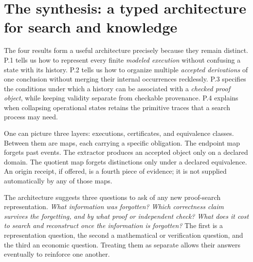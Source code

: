 \documentclass[11pt,letterpaper]{article}
\theoremstyle{plaincompact}
\begin{document}
\section{The synthesis: a typed architecture for search and knowledge}
The four results form a useful architecture precisely because they remain distinct. P.1 tells us how to represent every finite \emph{modeled execution} without confusing a state with its history. P.2 tells us how to organize multiple \emph{accepted derivations} of one conclusion without merging their internal occurrences recklessly. P.3 specifies the conditions under which a history can be associated with a \emph{checked proof object}, while keeping validity separate from checkable provenance. P.4 explains when collapsing operational states retains the primitive traces that a search process may need.

One can picture three layers: executions, certificates, and equivalence classes. Between them are maps, each carrying a specific obligation. The endpoint map forgets past events. The extractor produces an accepted object only on a declared domain. The quotient map forgets distinctions only under a declared equivalence. An origin receipt, if offered, is a fourth piece of evidence; it is not supplied automatically by any of those maps.

The architecture suggests three questions to ask of any new proof-search representation. \emph{What information was forgotten?} \emph{Which correctness claim survives the forgetting, and by what proof or independent check?} \emph{What does it cost to search and reconstruct once the information is forgotten?} The first is a representation question, the second a mathematical or verification question, and the third an economic question. Treating them as separate allows their answers eventually to reinforce one another.
\end{document}
